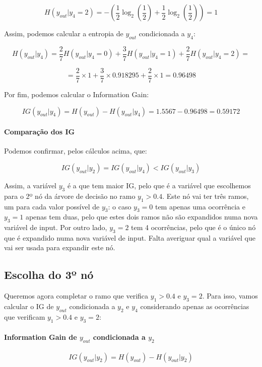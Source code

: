 \documentclass{article}
\begin{document}
\[ H(y_{out}|y_4 = 2) = - \left( \frac{1}{2} \log_2 \left( \frac{1}{2} \right) + \frac{1}{2} \log_2 \left( \frac{1}{2} \right) \right) = 1 \]

Assim, podemos calcular a entropia de $y_{out}$ condicionada a $y_4$:

\[ H(y_{out}|y_4) = \frac{2}{7} H(y_{out}|y_4 = 0) + \frac{3}{7} H(y_{out}|y_4 = 1) + \frac{2}{7} H(y_{out}|y_4 = 2) = \]

\[ = \frac{2}{7} \times 1 + \frac{3}{7} \times 0.918295 + \frac{2}{7} \times 1 = 0.96498 \]

Por fim, podemos calcular o Information Gain:

\[ IG(y_{out}|y_4) = H(y_{out}) - H(y_{out}|y_4) = 1.5567 - 0.96498 = 0.59172 \]

\paragraph{Comparação dos IG}

Podemos confirmar, pelos cálculos acima, que:

\[ IG(y_{out}|y_2) = IG(y_{out}|y_4) < IG(y_{out}|y_3) \]

Assim, a variável $y_3$ é a que tem maior IG, pelo que é a variável que escolhemos para o 2º nó da árvore de decisão no ramo $y_1>0.4$.
Este nó vai ter três ramos, um para cada valor possível de $y_3$: o caso $y_3=0$ tem apenas uma ocorrência e $y_3=1$ apenas tem duas, pelo que estes dois ramos não são expandidos numa nova variável de input.
Por outro lado, $y_3=2$ tem 4 ocorrências, pelo que é o único nó que é expandido numa nova variável de input. Falta averiguar qual a variável que vai ser usada para expandir este nó.

\subsection*{Escolha do 3º nó}

Queremos agora completar o ramo que verifica $y_1 > 0.4$ e $y_3 = 2$. Para isso, vamos calcular o IG de $y_{out}$ condicionada a $y_2$ e $y_4$ considerando apenas as ocorrências que verificam $y_1 > 0.4$ e $y_3 = 2$:

\paragraph{Information Gain de $y_{out}$ condicionada a $y_2$}

\[ IG(y_{out}|y_2) = H(y_{out}) - H(y_{out}|y_2) \]
\end{document}
